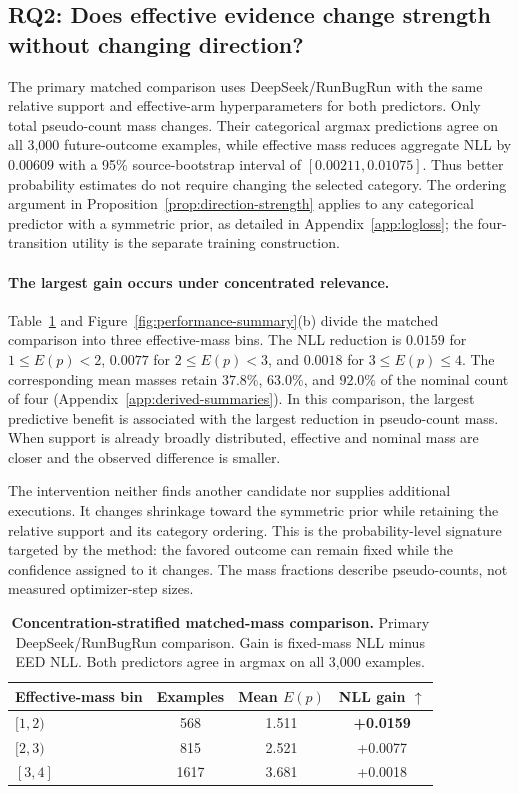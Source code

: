 \documentclass{article}
\begin{document}
\subsection{RQ2: Does effective evidence change strength without changing direction?}
\label{sec:rq2}

The primary matched comparison uses DeepSeek/RunBugRun with the same relative support and effective-arm hyperparameters for both predictors. Only total pseudo-count mass changes. Their categorical argmax predictions agree on all 3,000 future-outcome examples, while effective mass reduces aggregate NLL by $0.00609$ with a 95\% source-bootstrap interval of $[0.00211,0.01075]$. Thus better probability estimates do not require changing the selected category. The ordering argument in Proposition~\ref{prop:direction-strength} applies to any categorical predictor with a symmetric prior, as detailed in Appendix~\ref{app:logloss}; the four-transition utility is the separate training construction.

\paragraph{The largest gain occurs under concentrated relevance.}
Table~\ref{tab:concentration} and Figure~\ref{fig:performance-summary}(b) divide the matched comparison into three effective-mass bins. The NLL reduction is $0.0159$ for $1\le E(p)<2$, $0.0077$ for $2\le E(p)<3$, and $0.0018$ for $3\le E(p)\le4$. The corresponding mean masses retain $37.8\%$, $63.0\%$, and $92.0\%$ of the nominal count of four (Appendix~\ref{app:derived-summaries}). In this comparison, the largest predictive benefit is associated with the largest reduction in pseudo-count mass. When support is already broadly distributed, effective and nominal mass are closer and the observed difference is smaller.

The intervention neither finds another candidate nor supplies additional executions. It changes shrinkage toward the symmetric prior while retaining the relative support and its category ordering. This is the probability-level signature targeted by the method: the favored outcome can remain fixed while the confidence assigned to it changes. The mass fractions describe pseudo-counts, not measured optimizer-step sizes.

\begin{table}[t]
\centering
\small
\caption{\textbf{Concentration-stratified matched-mass comparison.} Primary DeepSeek/RunBugRun comparison. Gain is fixed-mass NLL minus EED NLL. Both predictors agree in argmax on all 3,000 examples.}
\setlength{\tabcolsep}{7pt}
\begin{tabular}{lccc}
\toprule
Effective-mass bin & Examples & Mean $E(p)$ & NLL gain $\uparrow$ \\
\midrule
$[1,2)$ & 568 & 1.511 & \textbf{+0.0159} \\
$[2,3)$ & 815 & 2.521 & +0.0077 \\
$[3,4]$ & 1617 & 3.681 & +0.0018 \\
\bottomrule
\end{tabular}
\label{tab:concentration}
\end{table}
\end{document}
